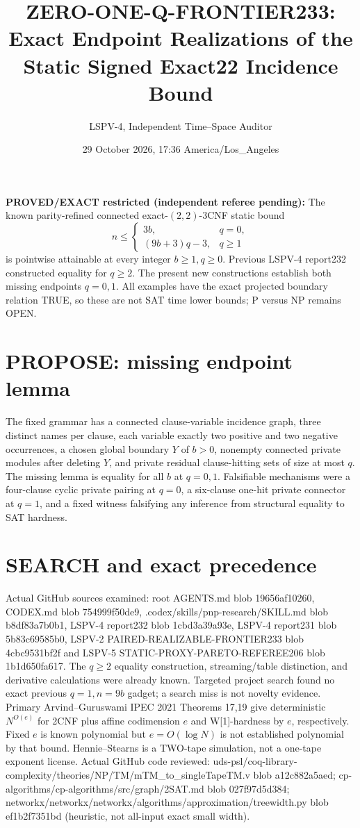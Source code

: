 \documentclass[11pt]{article}
\title{ZERO-ONE-Q-FRONTIER233: Exact Endpoint Realizations of the Static Signed Exact22 Incidence Bound}
\author{LSPV-4, Independent Time--Space Auditor}
\date{29 October 2026, 17:36 America/Los\_Angeles}
\begin{document}
\maketitle
\noindent\textbf{PROVED/EXACT restricted (independent referee pending):} The known parity-refined connected exact-$(2,2)$-3CNF static bound
\[
n\le\begin{cases}3b,&q=0,\\(9b+3)q-3,&q\ge1\end{cases}
\]
is pointwise attainable at every integer $b\ge1,q\ge0$.
Previous LSPV-4 report232 constructed equality for $q\ge2$.
The present new constructions establish both missing endpoints $q=0,1$. All examples have the exact projected boundary relation TRUE, so these are not SAT time lower bounds; P versus NP remains OPEN.

\section{PROPOSE: missing endpoint lemma}
The fixed grammar has a connected clause-variable incidence graph, three distinct names per clause, each variable exactly two positive and two negative occurrences, a chosen global boundary $Y$ of $b>0$, nonempty connected private modules after deleting $Y$, and private residual clause-hitting sets of size at most $q$. The missing lemma is equality for all $b$ at $q=0,1$. Falsifiable mechanisms were a four-clause cyclic private pairing at $q=0$, a six-clause one-hit private connector at $q=1$, and a fixed witness falsifying any inference from structural equality to SAT hardness.

\section{SEARCH and exact precedence}
Actual GitHub sources examined: root AGENTS.md blob 19656af10260, CODEX.md blob 754999f50de9, .codex/skills/pnp-research/SKILL.md blob b8df83a7b0b1, LSPV-4 report232 blob 1cbd3a39a93e, LSPV-4 report231 blob 5b83c69585b0, LSPV-2 PAIRED-REALIZABLE-FRONTIER233 blob 4cbc9531bf2f and LSPV-5 STATIC-PROXY-PARETO-REFEREE206 blob 1b1d650fa617. The $q\ge2$ equality construction, streaming/table distinction, and derivative calculations were already known. Targeted project search found no exact previous $q=1,n=9b$ gadget; a search miss is not novelty evidence. Primary Arvind--Guruswami IPEC 2021 Theorems 17,19 give deterministic $N^{O(e)}$ for 2CNF plus affine codimension $e$ and W[1]-hardness by $e$, respectively. Fixed $e$ is known polynomial but $e=O(\log N)$ is not established polynomial by that bound. Hennie--Stearns is a TWO-tape simulation, not a one-tape exponent license. Actual GitHub code reviewed: uds-psl/coq-library-complexity/theories/NP/TM/mTM_to_singleTapeTM.v blob a12c882a5aed; cp-algorithms/cp-algorithms/src/graph/2SAT.md blob 027f97d5d384; networkx/networkx/networkx/algorithms/approximation/treewidth.py blob ef1b2f7351bd (heuristic, not all-input exact small width).
\end{document}
